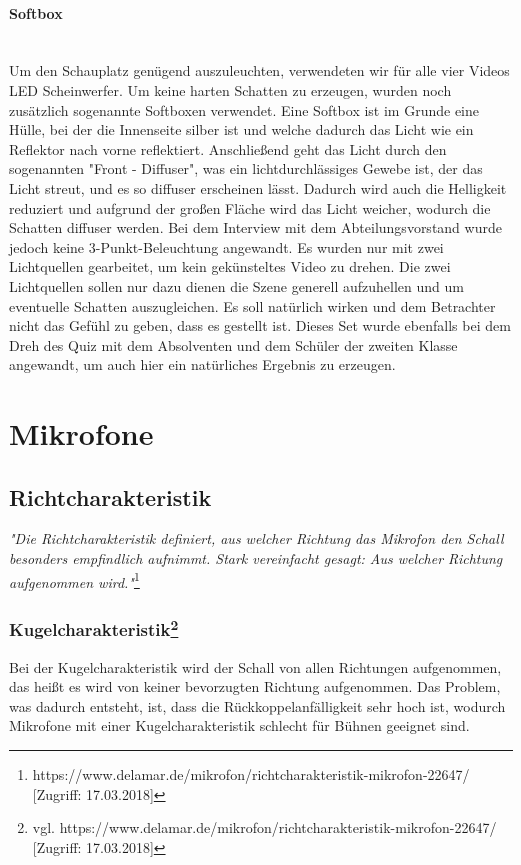 \paragraph{Softbox}
\leavevmode \\
Um den Schauplatz genügend auszuleuchten, verwendeten wir für alle vier Videos LED Scheinwerfer. Um keine harten Schatten zu erzeugen, wurden noch zusätzlich
sogenannte Softboxen verwendet. Eine Softbox ist im Grunde eine Hülle, bei der
die Innenseite silber ist und welche dadurch das Licht wie ein Reflektor nach vorne
reflektiert. Anschließend geht das Licht durch den sogenannten "Front - Diffuser", was
ein lichtdurchlässiges Gewebe ist, der das Licht streut, und es so diffuser erscheinen
lässt. Dadurch wird auch die Helligkeit reduziert und aufgrund der großen Fläche wird das Licht weicher, wodurch die Schatten diffuser werden. \newline
Bei dem Interview mit dem Abteilungsvorstand wurde jedoch keine 3-Punkt-Beleuchtung angewandt. Es wurden nur mit zwei Lichtquellen gearbeitet, um kein gekünsteltes Video zu drehen. Die zwei Lichtquellen sollen nur dazu dienen die Szene generell aufzuhellen und um eventuelle Schatten auszugleichen. Es soll natürlich wirken und dem Betrachter nicht das Gefühl zu geben, dass es gestellt ist.  Dieses Set wurde ebenfalls bei dem Dreh des Quiz mit dem Absolventen und dem Schüler der zweiten Klasse angewandt, um auch hier ein natürliches Ergebnis zu erzeugen.
\section{Mikrofone}
\subsection{Richtcharakteristik}
\textit{"Die Richtcharakteristik definiert, aus welcher Richtung das Mikrofon den Schall besonders empfindlich aufnimmt. Stark vereinfacht gesagt: Aus welcher Richtung aufgenommen wird."}\footnote{\label{}https://www.delamar.de/mikrofon/richtcharakteristik-mikrofon-22647/ [Zugriff: 17.03.2018]} 
\subsubsection[Kugelcharakteristik]{Kugelcharakteristik\protect\footnote{\label{}vgl. https://www.delamar.de/mikrofon/richtcharakteristik-mikrofon-22647/ [Zugriff: 17.03.2018]}}
Bei der Kugelcharakteristik wird der Schall von allen Richtungen aufgenommen, das heißt es wird von keiner bevorzugten Richtung aufgenommen. Das Problem, was dadurch entsteht, ist, dass die Rückkoppelanfälligkeit sehr hoch ist, wodurch Mikrofone mit einer Kugelcharakteristik schlecht für Bühnen geeignet sind. 
